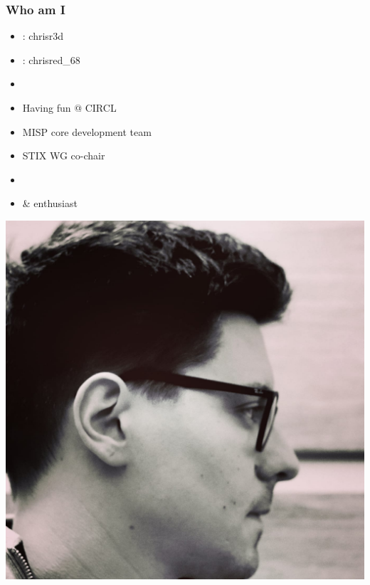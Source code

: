 
\begin{frame}[t,plain]
\titlepage
\end{frame}

\begin{frame}
    \frametitle{Who am I}
    \begin{minipage}{0.6\textwidth}
        \begin{itemize}
            \item \faGithub : chrisr3d \\
            \item \faTwitter : chrisred\_68
            \item []
            \item Having fun @ CIRCL
            \item MISP core development team
            \item STIX WG co-chair
            \item []
            \item \faCat \vspace{1em} \& \faCamera \vspace{1em} enthusiast
        \end{itemize}
    \end{minipage}%
    \begin{minipage}{0.4\textwidth}
        \includegraphics[scale=0.1]{images/profile_picture.jpg}
    \end{minipage}
\end{frame}

